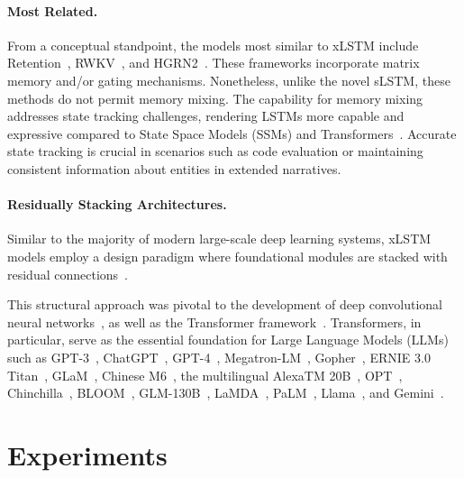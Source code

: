 \paragraph{Most Related.} From a conceptual standpoint, the models most similar to xLSTM include Retention~\citep{Sun:23arxiv}, RWKV~\citep{Peng:23arxivshort,Peng:24arxivshort}, and HGRN2~\citep{Qin:24arxiv}. These frameworks incorporate matrix memory and/or gating mechanisms. Nonetheless, unlike the novel sLSTM, these methods do not permit memory mixing. The capability for memory mixing addresses state tracking challenges, rendering LSTMs more capable and expressive compared to State Space Models (SSMs) and Transformers~\citep{Merrill:24,Deletang:23}. Accurate state tracking is crucial in scenarios such as code evaluation or maintaining consistent information about entities in extended narratives.

\paragraph{Residually Stacking Architectures.} Similar to the majority of modern large-scale deep learning systems, xLSTM models employ a design paradigm where foundational modules are stacked with residual connections~\citep{Srivastava:15,He:16}.

This structural approach was pivotal to the development of deep convolutional neural networks~\citep{He:16}, as well as the Transformer framework~\citep{Vaswani:17}. Transformers, in particular, serve as the essential foundation for Large Language Models (LLMs) such as GPT-3~\citep{Brown:20short}, ChatGPT~\citep{Schulman:22short}, GPT-4~\citep{Achiam:23gpt4short}, Megatron-LM~\citep{Shoeybi:19}, Gopher~\citep{Rae:21short}, ERNIE 3.0 Titan~\citep{Wang:21arxivshort}, GLaM~\citep{Du:21glamshort}, Chinese M6~\citep{Lin:21}, the multilingual AlexaTM 20B~\citep{Soltan:22}, OPT~\citep{Zhang:22opt}, Chinchilla~\citep{Hoffmann:22short}, BLOOM~\citep{Scao:22arxivshort}, GLM-130B~\citep{Zeng:22arxivshort}, LaMDA~\citep{Thoppilan:22short}, PaLM~\citep{Chowdhery:22short}, Llama~\citep{Touvron:23arxiv}, and Gemini~\citep{GeminiTeam:23arxiv,Reid:24arxiv}.

\section{Experiments}
\label{sec:Exp}

